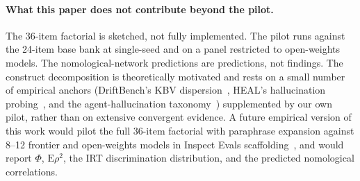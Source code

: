 \documentclass{article}
\begin{document}
\paragraph{What this paper does not contribute beyond the pilot.}
The 36-item factorial is sketched, not fully implemented. The pilot runs against the 24-item base bank at single-seed and on a panel restricted to open-weights models. The nomological-network predictions are predictions, not findings. The construct decomposition is theoretically motivated and rests on a small number of empirical anchors (DriftBench's KBV dispersion~\cite{driftbench2026}, HEAL's hallucination probing~\cite{heal2025}, and the agent-hallucination taxonomy~\cite{halluagentsurvey2025}) supplemented by our own pilot, rather than on extensive convergent evidence. A future empirical version of this work would pilot the full 36-item factorial with paraphrase expansion against 8--12 frontier and open-weights models in Inspect Evals scaffolding~\cite{inspectevals2024}, and would report $\Phi$, $\mathrm{E}\rho^2$, the IRT discrimination distribution, and the predicted nomological correlations.
\end{document}
